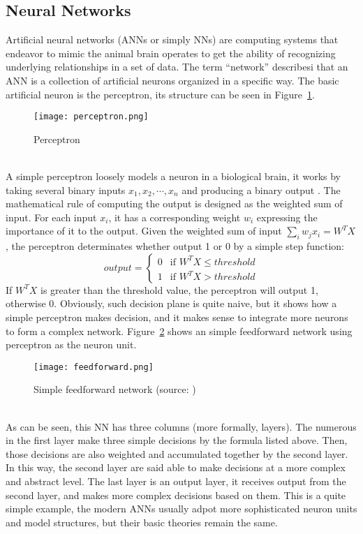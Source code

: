 \subsection{Neural Networks}
Artificial neural networks (ANNs or simply NNs) are computing systems that endeavor to mimic the animal brain operates to get the ability of recognizing underlying relationships in a set of data. The term ``network'' describesi that an ANN is a collection of artificial neurons organized in a specific way. The basic artificial neuron is the perceptron, its structure can be seen in Figure~\ref{fig:perceptron}. \\
\begin{figure}[!htbp]
    \centering
    \texttt{[image: perceptron.png]}
    \caption{Perceptron}
    \label{fig:perceptron}
\end{figure} 
\\A simple perceptron loosely models a neuron in a biological brain, it works by taking several binary inputs $x_1, x_2, \cdots, x_n$ and producing a binary output \cite{rojas2013neural}. The mathematical rule of computing the output is designed as the weighted sum of input. For each input $x_i$, it has a corresponding weight $w_i$ expressing the importance of it to the output. Given the weighted sum of input $\sum_i w_jx_i = W^TX$, the perceptron determinates whether output 1 or 0 by a simple step function:
\begin{equation}
    output = 
    \begin{cases}
        0 & \text{if $W^TX \leq threshold$}\\
        1 & \text{if $W^TX > threshold$}
    \end{cases} 
\end{equation}
If $W^TX$ is greater than the threshold value, the perceptron will output 1, otherwise 0. Obviously, such decision plane is quite naive, but it shows how a simple perceptron makes decision, and it makes sense to integrate more neurons to form a complex network. Figure~\ref{fig:feedforward} shows an simple feedforward network using perceptron as the neuron unit.\\
\begin{figure}[!htbp]
    \centering
    \texttt{[image: feedforward.png]}
    \caption{Simple feedforward network (source: \cite{rojas2013neural})}
    \label{fig:feedforward}
\end{figure} 
\\As can be seen, this NN has three columns (more formally, layers). The numerous in the first layer make three simple decisions by the formula listed above. Then, those decisions are also weighted and accumulated together by the second layer. In this way, the second layer are said able to make decisions at a more complex and abstract level. The last layer is an output layer, it receives output from the second layer, and makes more complex decisions based on them. This is a quite simple example, the modern ANNs usually adpot more sophisticated neuron units and model structures, but their basic theories remain the same. \\
